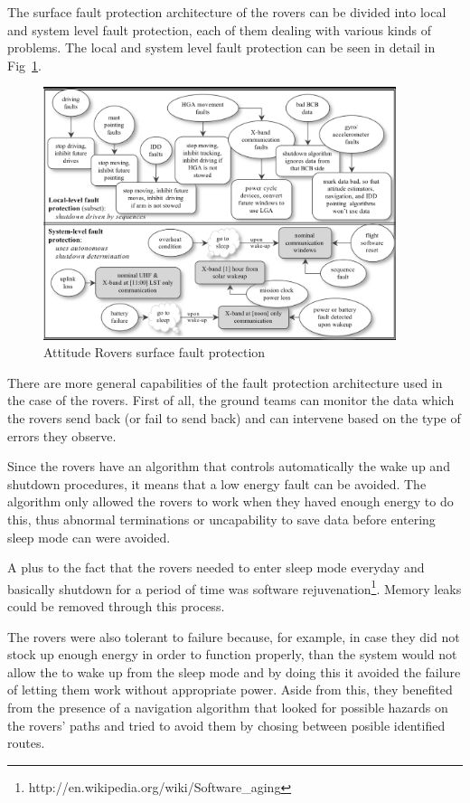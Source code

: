 The surface fault protection architecture of the rovers can be divided into
local and system level fault protection, each of them dealing with various kinds of
problems. The local and system level fault protection can be seen in detail in
Fig~\ref{fig:rovers}.
\cite{fprot}

\begin{figure}[htb]
	\begin{center}
	\includegraphics[width=0.92\textwidth]{img/rovers.png}
	\caption{Attitude Rovers surface fault protection\cite{surv-nasa-mars}}
	\label{fig:rovers}
	\end{center}
\end{figure}

There are more general capabilities of the fault protection architecture used in
the case of the rovers. First of all, the ground teams can monitor the data
which the rovers send back (or fail to send back) and can intervene based on the
type of errors they observe.

Since the rovers have an algorithm that controls automatically the wake up and
shutdown procedures, it means that a low energy fault can be avoided. The
algorithm only allowed the rovers to work when they haved enough energy to do
this, thus abnormal terminations or uncapability to save data before entering
sleep mode can were avoided. 

A plus to the fact that the rovers needed to enter sleep mode everyday and
basically shutdown for a period of time was software
rejuvenation\footnote{http://en.wikipedia.org/wiki/Software\_aging}. Memory
leaks could be removed through this process.

The rovers were also tolerant to failure because, for example, in case they did
not stock up enough energy in order to function properly, than the system would
not allow the to wake up from the sleep mode and by doing this it avoided the
failure of letting them work without appropriate power. Aside from this, they
benefited from the presence of a navigation algorithm that looked for possible
hazards on the rovers' paths and tried to avoid them by chosing between posible
identified routes.

